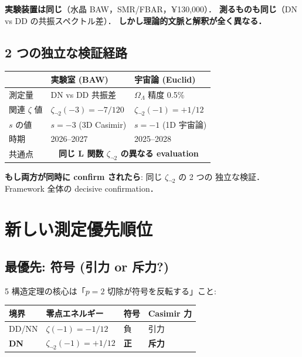 \documentclass[11pt,a4paper]{article}
\begin{document}
\textbf{実験装置は同じ}（水晶 BAW，SMR/FBAR，¥130,000）．
\textbf{測るものも同じ}（DN vs DD の共振スペクトル差）．
\textbf{しかし理論的文脈と解釈が全く異なる．}

\subsection{2 つの独立な検証経路}

\begin{center}
\begin{tabular}{lll}
\toprule
& 実験室 (BAW) & 宇宙論 (Euclid) \\
\midrule
測定量 & DN vs DD 共振差 & $\Omega_\Lambda$ 精度 0.5\% \\
関連 $\zeta$ 値 & $\zeta_{\neg 2}(-3) = -7/120$ & $\zeta_{\neg 2}(-1) = +1/12$ \\
$s$ の値 & $s = -3$ (3D Casimir) & $s = -1$ (1D 宇宙論) \\
時期 & 2026--2027 & 2025--2028 \\
共通点 & \multicolumn{2}{c}{\textbf{同じ L 関数 $\zeta_{\neg 2}$ の異なる evaluation}} \\
\bottomrule
\end{tabular}
\end{center}

\textbf{もし両方が同時に confirm されたら}: 同じ $\zeta_{\neg 2}$ の 2 つの
独立な検証．Framework 全体の decisive confirmation．

\section{新しい測定優先順位}

\subsection{最優先: 符号 (引力 or 斥力?)}

5 構造定理の核心は「$p=2$ 切除が符号を反転する」こと:

\begin{center}
\begin{tabular}{llll}
\toprule
境界 & 零点エネルギー & 符号 & Casimir 力 \\
\midrule
DD/NN & $\zeta(-1) = -1/12$ & 負 & 引力 \\
\textbf{DN} & $\zeta_{\neg 2}(-1) = +1/12$ & \textbf{正} & \textbf{斥力} \\
\bottomrule
\end{tabular}
\end{center}
\end{document}

